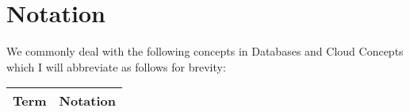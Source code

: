 \section{Notation}

We commonly deal with the following concepts in 
Databases and Cloud Concepts
which I will abbreviate as follows for brevity:
\begin{center}
    \begin{tabular}{ | r | c | }
        \hline
        Term & Notation \\
        \hline \hline
        \hline
    \end{tabular}
\end{center}